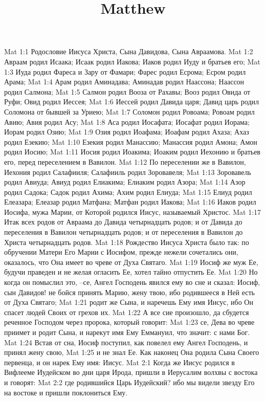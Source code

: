 

\title{Matthew}

Mat 1:1  Родословие Иисуса Христа, Сына Давидова, Сына Авраамова.
Mat 1:2  Авраам родил Исаака; Исаак родил Иакова; Иаков родил Иуду и братьев его;
Mat 1:3  Иуда родил Фареса и Зару от Фамари; Фарес родил Есрома; Есром родил Арама;
Mat 1:4  Арам родил Аминадава; Аминадав родил Наассона; Наассон родил Салмона;
Mat 1:5  Салмон родил Вооза от Рахавы; Вооз родил Овида от Руфи; Овид родил Иессея;
Mat 1:6  Иессей родил Давида царя; Давид царь родил Соломона от бывшей за Уриею;
Mat 1:7  Соломон родил Ровоама; Ровоам родил Авию; Авия родил Асу;
Mat 1:8  Аса родил Иосафата; Иосафат родил Иорама; Иорам родил Озию;
Mat 1:9  Озия родил Иоафама; Иоафам родил Ахаза; Ахаз родил Езекию;
Mat 1:10  Езекия родил Манассию; Манассия родил Амона; Амон родил Иосию;
Mat 1:11  Иосия родил Иоакима; Иоаким родил Иехонию и братьев его, перед переселением в Вавилон.
Mat 1:12  По переселении же в Вавилон, Иехония родил Салафииля; Салафииль родил Зоровавеля;
Mat 1:13  Зоровавель родил Авиуда; Авиуд родил Елиакима; Елиаким родил Азора;
Mat 1:14  Азор родил Садока; Садок родил Ахима; Ахим родил Елиуда;
Mat 1:15  Елиуд родил Елеазара; Елеазар родил Матфана; Матфан родил Иакова;
Mat 1:16  Иаков родил Иосифа, мужа Марии, от Которой родился Иисус, называемый Христос.
Mat 1:17  Итак всех родов от Авраама до Давида четырнадцать родов; и от Давида до переселения в Вавилон четырнадцать родов; и от переселения в Вавилон до Христа четырнадцать родов.
Mat 1:18  Рождество Иисуса Христа было так: по обручении Матери Его Марии с Иосифом, прежде нежели сочетались они, оказалось, что Она имеет во чреве от Духа Святаго.
Mat 1:19  Иосиф же муж Ее, будучи праведен и не желая огласить Ее, хотел тайно отпустить Ее.
Mat 1:20  Но когда он помыслил это, --се, Ангел Господень явился ему во сне и сказал: Иосиф, сын Давидов! не бойся принять Марию, жену твою, ибо родившееся в Ней есть от Духа Святаго;
Mat 1:21  родит же Сына, и наречешь Ему имя Иисус, ибо Он спасет людей Своих от грехов их.
Mat 1:22  А все сие произошло, да сбудется реченное Господом через пророка, который говорит:
Mat 1:23  се, Дева во чреве приимет и родит Сына, и нарекут имя Ему Еммануил, что значит: с нами Бог.
Mat 1:24  Встав от сна, Иосиф поступил, как повелел ему Ангел Господень, и принял жену свою,
Mat 1:25  и не знал Ее. Как наконец Она родила Сына Своего первенца, и он нарек Ему имя: Иисус.
Mat 2:1  Когда же Иисус родился в Вифлееме Иудейском во дни царя Ирода, пришли в Иерусалим волхвы с востока и говорят:
Mat 2:2  где родившийся Царь Иудейский? ибо мы видели звезду Его на востоке и пришли поклониться Ему.
